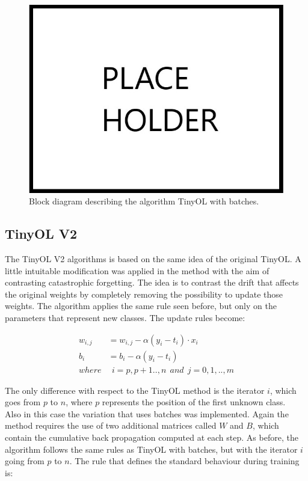 \documentclass[12pt]{report}
\begin{document}
\begin{figure}[h!]
    \centering
    \includegraphics[width=120mm]{Figures/Chapter3/PLACEHOLDER.jpg} 
    \caption{Block diagram describing the algorithm TinyOL with batches.}
    \label{fig:block_diag_OLwb}    
\end{figure}

\subsection{TinyOL V2}
The TinyOL V2 algorithms is based on the same idea of the original TinyOL. A little intuitable modification was applied in the method with the aim of contrasting catastrophic forgetting. The idea is to contrast the drift that affects the original weights by completely removing the possibility to update those weights. The algorithm applies the same rule seen before, but only on the parameters that represent new classes. The update rules become:

\begin{align}
	w_{i,j} &= w_{i,j} - \alpha (y_i - t_i) \cdot x_i \\
    b_i     &= b_i - \alpha (y_i - t_i) \\
    where   & \: \: i= p,p+1..,n  \: \: and \: \:  j=0,1,..,m \nonumber  
\end{align}

The only difference with respect to the TinyOL method is the iterator $i$, which goes from $p$ to $n$, where $p$ represents the position of the first unknown class. \\
Also in this case the variation that uses batches was implemented. Again the method requires the use of two additional matrices called $W$ and $B$, which contain the cumulative back propagation computed at each step. As before, the algorithm follows the same rules as TinyOL with batches, but with the iterator $i$ going from $p$ to $n$. The rule that defines the standard behaviour during training is:
\end{document}
